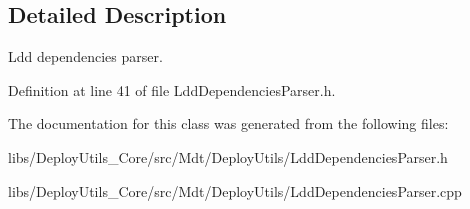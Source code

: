 \subsection{Detailed Description}
Ldd dependencies parser. 

Definition at line 41 of file Ldd\+Dependencies\+Parser.\+h.



The documentation for this class was generated from the following files\+:\begin{DoxyCompactItemize}
\item 
libs/\+Deploy\+Utils\+\_\+\+Core/src/\+Mdt/\+Deploy\+Utils/Ldd\+Dependencies\+Parser.\+h\item 
libs/\+Deploy\+Utils\+\_\+\+Core/src/\+Mdt/\+Deploy\+Utils/Ldd\+Dependencies\+Parser.\+cpp\end{DoxyCompactItemize}
